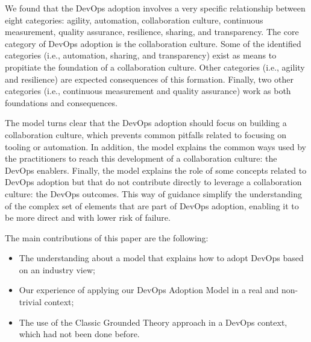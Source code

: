 
We found that the DevOps adoption involves a very specific relationship between
eight categories: agility, automation, collaboration culture, continuous
measurement, quality assurance, resilience, sharing, and transparency. The core
category of DevOps adoption is the collaboration culture. Some of the
identified categories (i.e., automation, sharing, and transparency) exist as
means to propitiate the foundation of a collaboration culture. Other categories
(i.e., agility and resilience) are expected consequences of this formation.
Finally, two other categories (i.e., continuous measurement and quality
assurance) work as both foundations and consequences.

The model turns clear that the DevOps adoption should focus on building a
collaboration culture, which prevents common pitfalls related to focusing on
tooling or automation. In addition, the model explains the common ways used by
the practitioners to reach this development of a collaboration culture: the
DevOps enablers. Finally, the model explains the role of some concepts related to
DevOps adoption but that do not contribute directly to leverage a collaboration culture:
the DevOps outcomes. This way of guidance simplify the understanding of the
complex set of elements that are part of DevOps adoption, enabling it to be
more direct and with lower risk of failure.

%

The main contributions of this paper are the following:

\begin{itemize}
\item The understanding about a model that explains how to adopt DevOps based on an industry view;
\item Our experience of applying our DevOps Adoption Model in a real and non-trivial context; 
\item The use of the Classic Grounded Theory approach in a DevOps context, which had not been done before.
\end{itemize}


